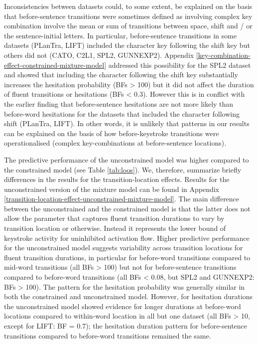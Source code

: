 \documentclass[
  english,
  man,floatsintext]{apa7}
\begin{document}
Inconsistencies between datasets could, to some extent, be explained on the basis that before-sentence transitions were sometimes defined as involving complex key combination involve the mean or sum of transitions between space, shift and / or the sentence-initial letters. In particular, before-sentence transitions in some datasets (PLanTra, LIFT) included the character key following the shift key but others did not (CATO, C2L1, SPL2, GUNNEXP2). Appendix \ref{key-combination-effect-constrained-mixture-model} addressed this possibility for the SPL2 dataset and showed that including the character following the shift key substantially increases the hesitation probability (BFs \textgreater{} 100) but it did not affect the duration of fluent transitions or hesitations (BFs \textless{} 0.3). However this is in conflict with the earlier finding that before-sentence hesitations are not more likely than before-word hesitations for the datasets that included the character following shift (PLanTra, LIFT). In other words, it is unlikely that patterns in our results can be explained on the basis of how before-keystroke transitions were operationalised (complex key-combinations at before-sentence locations).

The predictive performance of the unconstrained model was higher compared to the constrained model (see Table \ref{tab:loos}). We, therefore, summarize briefly differences in the results for the transition-location effects. Results for the unconstrained version of the mixture model can be found in Appendix \ref{transition-location-effect-unconstrained-mixture-model}. The main difference between the unconstrained and the constrained model is that the latter does not allow the parameter that captures fluent transition durations to vary by transition location or otherwise. Instead it represents the lower bound of keystroke activity for uninhibited activation flow. Higher predictive performance for the unconstrained model suggests variability across transition locations for fluent transition durations, in particular for before-word transitions compared to mid-word transitions (all BFs \textgreater{} 100) but not for before-sentence transitions compared to before-word transitions (all BFs \textless{} 0.08, but SPL2 and GUNNEXP2: BFs \textgreater{} 100). The pattern for the hesitation probability was generally similar in both the constrained and unconstrained model. However, for hesitation durations the unconstrained model showed evidence for longer durations at before-word locations compared to within-word location in all but one dataset (all BFs \textgreater{} 10, except for LIFT: BF = 0.7); the hesitation duration pattern for before-sentence transitions compared to before-word transitions remained the same.
\end{document}
